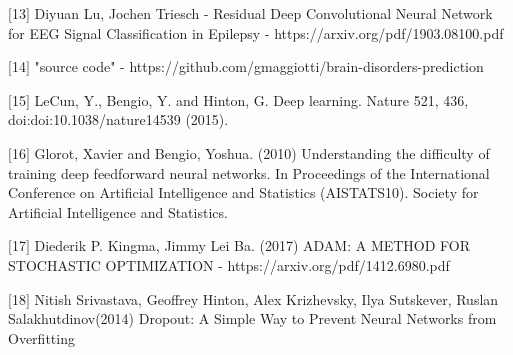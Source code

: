 \documentclass{llncs}       %
\begin{document}
\begin{thebibliography}{}
$[$13$]$ Diyuan Lu, Jochen Triesch - Residual Deep Convolutional Neural Network for
EEG Signal Classification in Epilepsy - https://arxiv.org/pdf/1903.08100.pdf

$[$14$]$ "source code" - https://github.com/gmaggiotti/brain-disorders-prediction

$[$15$]$ LeCun, Y., Bengio, Y. and Hinton, G. Deep learning. Nature 521, 436, doi:doi:10.1038/nature14539 (2015).

$[$16$]$ Glorot, Xavier and Bengio, Yoshua. (2010) Understanding the difficulty of training deep feedforward neural networks. In Proceedings of the International Conference on Artificial Intelligence and Statistics (AISTATS10). Society for Artificial Intelligence and Statistics.

$[$17$]$ Diederik P. Kingma, Jimmy Lei Ba. (2017) ADAM: A METHOD FOR STOCHASTIC OPTIMIZATION - https://arxiv.org/pdf/1412.6980.pdf

$[$18$]$ Nitish Srivastava, Geoffrey Hinton, Alex Krizhevsky, Ilya Sutskever, Ruslan Salakhutdinov(2014) Dropout: A Simple Way to Prevent Neural Networks from Overfitting

\end{thebibliography}
\end{document}
